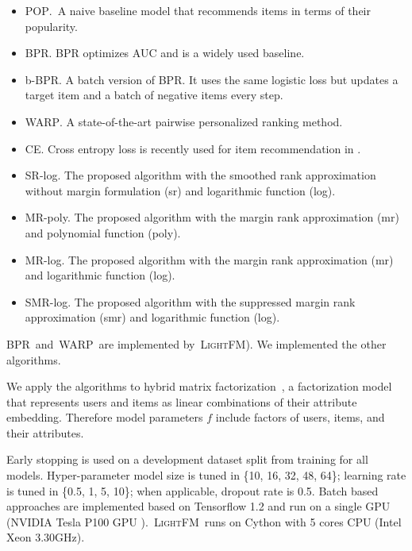 \documentclass[letterpaper]{article} %
\newcommand{\lightfm}{\textsc{LightFM}}
\newcommand{\pop}{\textsc{POP}}
\newcommand{\awarp}{\textsc{WARP}}
\newcommand{\bbpr}{b-BPR}
\newcommand{\bpr}{BPR}
\begin{document}
\begin{itemize}
\item \pop.~A naive baseline model that recommends items in terms of their popularity. 
\item \bpr\cite{rendle2009bpr}. BPR optimizes AUC and is a widely used baseline.
\item \bbpr. A batch version of BPR. It uses the same logistic loss but updates a target item and a batch of negative items every step.%
\item \awarp\cite{weston2010large,hong2013co}. A state-of-the-art pairwise personalized ranking method.
\item CE. Cross entropy loss is recently used for item recommendation in \cite{hidasi2015session,covington2016deep}. %
\item SR-log. The proposed algorithm with the smoothed rank approximation without margin formulation (sr) and logarithmic function (log).
\item MR-poly. The proposed algorithm with the margin rank approximation (mr) and polynomial function (poly).
\item MR-log. The proposed algorithm with the margin rank approximation (mr) and logarithmic function (log).
\item SMR-log. The proposed algorithm with the suppressed margin rank approximation (smr) and logarithmic function (log).
\end{itemize}

\bpr~and~\awarp~are implemented by~\lightfm \cite{kula_metadata_2015}). We implemented the other algorithms. 
 
We apply the algorithms to hybrid matrix factorization~\cite{shmueli2012care}, a factorization model that represents users and items as linear combinations of their attribute embedding. Therefore model parameters $f$ include factors of users, items, and their attributes.

Early stopping is used on a development dataset split from training for all models. Hyper-parameter model size is tuned in \{10, 16, 32, 48, 64\}; learning rate is tuned in \{0.5, 1, 5, 10\}; when applicable, dropout rate is 0.5. Batch based approaches are implemented based on Tensorflow 1.2 and run on a single GPU (NVIDIA Tesla P100 GPU ).~\lightfm~runs on Cython with 5 cores CPU (Intel Xeon 3.30GHz).
\end{document}
